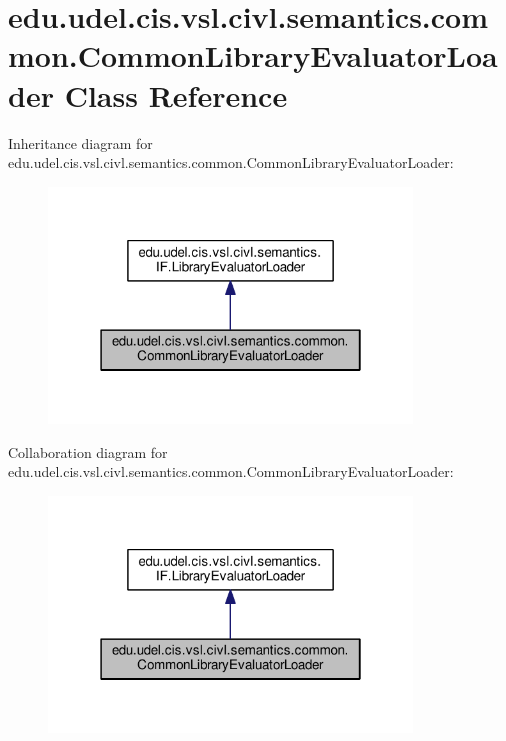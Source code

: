\hypertarget{classedu_1_1udel_1_1cis_1_1vsl_1_1civl_1_1semantics_1_1common_1_1CommonLibraryEvaluatorLoader}{}\section{edu.\+udel.\+cis.\+vsl.\+civl.\+semantics.\+common.\+Common\+Library\+Evaluator\+Loader Class Reference}
\label{classedu_1_1udel_1_1cis_1_1vsl_1_1civl_1_1semantics_1_1common_1_1CommonLibraryEvaluatorLoader}


Inheritance diagram for edu.\+udel.\+cis.\+vsl.\+civl.\+semantics.\+common.\+Common\+Library\+Evaluator\+Loader\+:
\nopagebreak
\begin{figure}[H]
\begin{center}
\leavevmode
\includegraphics[width=274pt]{classedu_1_1udel_1_1cis_1_1vsl_1_1civl_1_1semantics_1_1common_1_1CommonLibraryEvaluatorLoader__inherit__graph}
\end{center}
\end{figure}


Collaboration diagram for edu.\+udel.\+cis.\+vsl.\+civl.\+semantics.\+common.\+Common\+Library\+Evaluator\+Loader\+:
\nopagebreak
\begin{figure}[H]
\begin{center}
\leavevmode
\includegraphics[width=274pt]{classedu_1_1udel_1_1cis_1_1vsl_1_1civl_1_1semantics_1_1common_1_1CommonLibraryEvaluatorLoader__coll__graph}
\end{center}
\end{figure}
